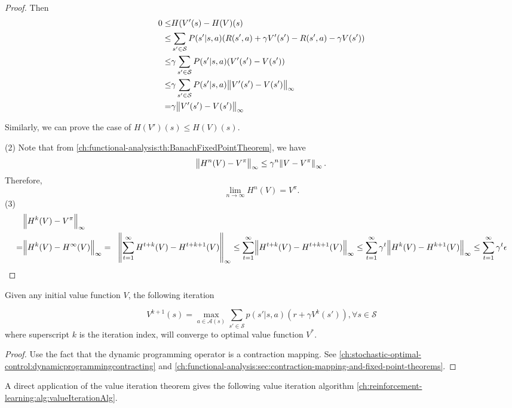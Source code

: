 \begin{refsection}
\begin{proof}
Then
\begin{align*}
0 \leq & H(V'(s) - H(V)(s) \\
	\leq & \sum_{s'\in \mathcal{S}}P(s'|s, a ) (R(s',a) + \gamma V'(s') - R(s',a) - \gamma V(s')) \\
	\leq & \gamma \sum_{s'\in \mathcal{S}}P(s'|s, a ) (V'(s') - V(s')) \\
	\leq & \gamma \sum_{s'\in \mathcal{S}}P(s'|s, a ) \norm{V'(s') - V(s')}_\infty \\
	= & \gamma \norm{V'(s') - V(s')}_\infty
\end{align*}

Similarly, we can prove the case of $H(V')(s) \leq H(V)(s)$.
	
	(2) 
	Note that from \autoref{ch:functional-analysis:th:BanachFixedPointTheorem}, we have 
	$$\norm{H^{n}(V) - V^\pi}_\infty \leq \gamma^n \norm{V - V^\pi}_\infty.$$
	Therefore, 
	$$\lim_{n\to\infty} H^{n}(V) = V^\pi.$$
	(3)
	\begin{align*}
	& \norm{H^k(V) - V^\pi}_\infty \\
	=& \norm{H^k(V) - H^\infty(V)}_\infty
	=& \norm{\sum_{t=1}^\infty H^{t+k}(V) - H^{t+k + 1}(V)}_\infty
	\leq \sum_{t=1}^\infty \norm{H^{t+k}(V) - H^{t+k + 1}(V)}_\infty
	\leq \sum_{t=1}^\infty \gamma^t \norm{H^{k}(V) - H^{k + 1}(V)}_\infty
	\leq \sum_{t=1}^\infty \gamma^t\epsilon
	\end{align*}
	
	
\end{proof}


\begin{theorem}\label{ch:reinforcement-learning:th:valueIteration}
Given any initial value function $V$, the following iteration 

$$V^{k+1}(s) = \max_{a\in\mathcal{A}(s)}\sum_{s' \in \mathcal{S}}p(s'|s,a)(r + \gamma V^{k}(s')), \forall s\in \mathcal{S}$$
where superscript $k$ is the iteration index,
will converge to optimal value function $V^*$. 
\end{theorem}
\begin{proof}
	Use the fact that the dynamic programming operator is a contraction mapping. See \autoref{ch:stochastic-optimal-control:dynamicprogrammingcontracting} and \autoref{ch:functional-analysis:sec:contraction-mapping-and-fixed-point-theorems}.
\end{proof}


A direct application of the value iteration theorem gives the following value iteration algorithm \autoref{ch:reinforcement-learning:alg:valueIterationAlg}.



\end{refsection}
